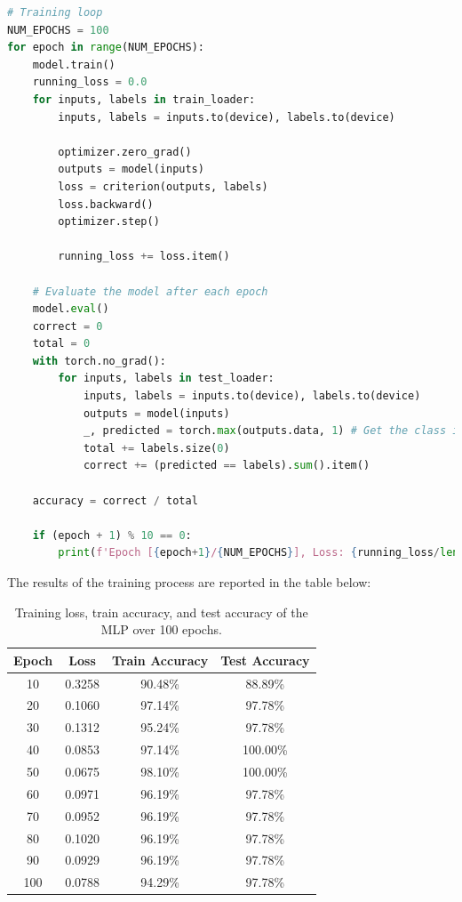 \documentclass{article}
\begin{document}
\begin{lstlisting}[language=Python]
# Training loop
NUM_EPOCHS = 100
for epoch in range(NUM_EPOCHS):
    model.train()
    running_loss = 0.0
    for inputs, labels in train_loader:
        inputs, labels = inputs.to(device), labels.to(device)
        
        optimizer.zero_grad()
        outputs = model(inputs)
        loss = criterion(outputs, labels)
        loss.backward()
        optimizer.step()

        running_loss += loss.item()

    # Evaluate the model after each epoch
    model.eval()
    correct = 0
    total = 0
    with torch.no_grad():
        for inputs, labels in test_loader:
            inputs, labels = inputs.to(device), labels.to(device)
            outputs = model(inputs)
            _, predicted = torch.max(outputs.data, 1) # Get the class index with the highest probability
            total += labels.size(0)
            correct += (predicted == labels).sum().item()

    accuracy = correct / total

    if (epoch + 1) % 10 == 0:
        print(f'Epoch [{epoch+1}/{NUM_EPOCHS}], Loss: {running_loss/len(train_loader):.4f}, Accuracy: {accuracy * 100:.2f}%')
\end{lstlisting}

The results of the training process are reported in the table below:
\begin{table}[H]
    \centering
    \begin{tabular}{|c|c|c|c|}
        \hline
        \textbf{Epoch} & \textbf{Loss} & \textbf{Train Accuracy} & \textbf{Test Accuracy} \\
        \hline
        10 & 0.3258 & 90.48\% & 88.89\% \\
        20 & 0.1060 & 97.14\% & 97.78\% \\
        30 & 0.1312 & 95.24\% & 97.78\% \\
        40 & 0.0853 & 97.14\% & 100.00\% \\
        50 & 0.0675 & 98.10\% & 100.00\% \\
        60 & 0.0971 & 96.19\% & 97.78\% \\
        70 & 0.0952 & 96.19\% & 97.78\% \\
        80 & 0.1020 & 96.19\% & 97.78\% \\
        90 & 0.0929 & 96.19\% & 97.78\% \\
        100 & 0.0788 & 94.29\% & 97.78\% \\
        \hline
    \end{tabular}
    \caption{\centering Training loss, train accuracy, and test accuracy of the MLP over 100 epochs.}
    \label{tab:mlp-training}
\end{table}
\end{document}
